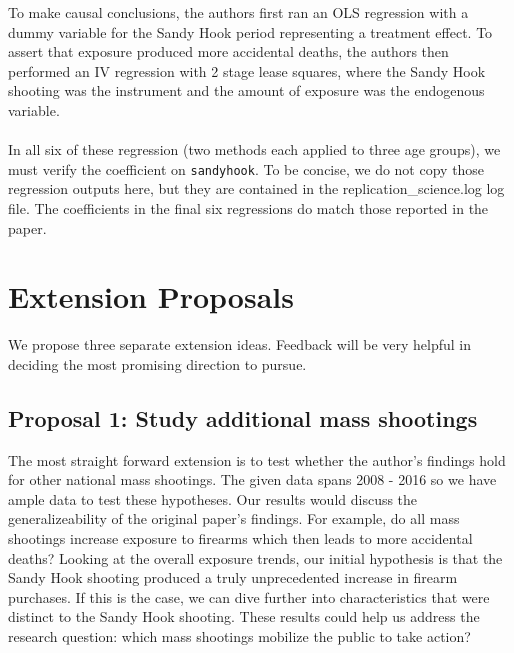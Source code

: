 \documentclass[12pt]{article}%
\begin{document}
To make causal conclusions, the authors first ran an OLS regression with a dummy variable for the Sandy Hook period representing a treatment effect. To assert that exposure produced more accidental deaths, the authors then performed an IV regression with 2 stage lease squares, where the Sandy Hook shooting was the instrument and the amount of exposure was the endogenous variable. \\ \\
In all six of these regression (two methods each applied to three age groups), we must verify the coefficient on \texttt{sandyhook}. To be concise, we do not copy those regression outputs here, but they are contained in the replication\_science.log log file. The coefficients in the final six regressions do match those reported in the paper.
\newpage 
\section*{Extension Proposals} 
We propose three separate extension ideas. Feedback will be very helpful in deciding the most promising direction to pursue. 
\subsection*{Proposal 1: Study additional mass shootings}
The most straight forward extension is to test whether the author's findings hold for other national mass shootings. The given data spans 2008 - 2016 so we have ample data to test these hypotheses. Our results would discuss the generalizeability of the original paper's findings. For example, do all mass shootings increase exposure to firearms which then leads to more accidental deaths? Looking at the overall exposure trends, our initial hypothesis is that the Sandy Hook shooting produced a truly unprecedented increase in firearm purchases. If this is the case, we can dive further into characteristics that were distinct to the Sandy Hook shooting. These results could help us address the research question: which mass shootings mobilize the public to take action? 
\end{document}
